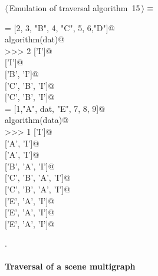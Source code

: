 \documentclass[11pt,oneside]{article}	%
\begin{document}
\begin{flushleft} \small \label{scrap28}
\protect{}$\langle\,$Emulation of traversal algorithm\nobreak\ {\footnotesize 15}$\,\rangle\equiv$
\vspace{-1ex}
\begin{list}{}{} \item
\mbox{}\verb@dat = [2, 3, "B", 4, "C", 5, 6,"D"]@\\
\mbox{}\verb@print algorithm(dat)@\\
\mbox{}\verb@>>> 2 ['I']@\\
\mbox{} ['I']@\\
\mbox{} ['B', 'I']@\\
\mbox{} ['C', 'B', 'I']@\\
\mbox{} ['C', 'B', 'I']@\\
\mbox{}\verb@data = [1,"A", dat, "E", 7, 8, 9]@\\
\mbox{}\verb@print algorithm(data)@\\
\mbox{}\verb@>>> 1 ['I']@\\
\mbox{} ['A', 'I']@\\
\mbox{} ['A', 'I']@\\
\mbox{} ['B', 'A', 'I']@\\
\mbox{} ['C', 'B', 'A', 'I']@\\
\mbox{} ['C', 'B', 'A', 'I']@\\
\mbox{} ['E', 'A', 'I']@\\
\mbox{} ['E', 'A', 'I']@\\
\mbox{} ['E', 'A', 'I']@\\
\mbox{}\verb@@{\NWsep}
\end{list}
\vspace{-1ex}
\footnotesize\addtolength{\baselineskip}{-1ex}
\begin{list}{}{\setlength{\itemsep}{-\parsep}\setlength{\itemindent}{-\leftmargin}}
\item {\NWtxtMacroNoRef}.
\end{list}
\end{flushleft}

\paragraph{Traversal of a scene multigraph}
\end{document}
